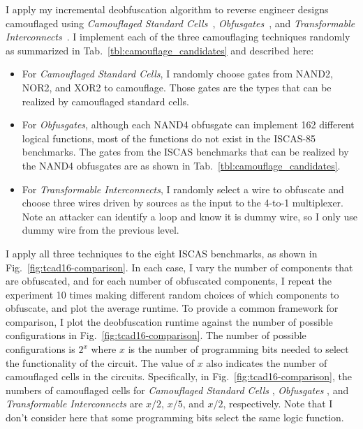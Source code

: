 \documentclass[thesis]{umassthesis}  %
\begin{document}
I apply my incremental deobfuscation algorithm to reverse engineer designs camouflaged using \textit{Camouflaged Standard Cells}~\cite{rajendran-13}, \textit{Obfusgates}~\cite{malik-obfusgate}, and \textit{Transformable Interconnects}~\cite{chen-2015-dummyWire}. I implement each of the three camouflaging techniques randomly as summarized in Tab.~\ref{tbl:camouflage_candidates} and described here: 
\begin{itemize}

\item For \textit{Camouflaged Standard Cells}, I randomly choose gates from NAND2, NOR2, and XOR2 to camouflage. Those gates are the types that can be realized by camouflaged standard cells.

\item For \textit{Obfusgates}, although each NAND4 obfusgate can implement 162 different logical functions, most of the functions do not exist in the ISCAS-85 benchmarks. The gates from the ISCAS benchmarks that can be realized by the NAND4 obfusgates are as shown in Tab.~\ref{tbl:camouflage_candidates}.

\item For \textit{Transformable Interconnects}, I randomly select a wire to obfuscate and choose three wires driven by sources as the input to the 4-to-1 multiplexer. Note an attacker can identify a loop and know it is dummy wire, so I only use dummy wire from the previous level.

\end{itemize}



I apply all three techniques to the eight ISCAS benchmarks, as shown in Fig.~\ref{fig:tcad16-comparison}. In each case, I vary the number of components that are obfuscated, and for each number of obfuscated components, I repeat the experiment 10 times making different random choices of which components to obfuscate, and plot the average runtime. To provide a common framework for comparison, I plot the deobfuscation runtime against the number of possible configurations in Fig.~\ref{fig:tcad16-comparison}. The number of possible configurations is $2^x$ where $x$ is the number of programming bits needed to select the functionality of the circuit. {The value of $x$ also indicates the number of camouflaged cells in the circuits. Specifically, in Fig.~\ref{fig:tcad16-comparison}, the numbers of camouflaged cells for \textit{Camouflaged Standard Cells} \cite{rajendran-13}, \textit{Obfusgates} \cite{malik-obfusgate}, and \textit{Transformable Interconnects} \cite{chen-2015-dummyWire} are $x/2$, $x/5$, and $x/2$, respectively}. Note that I don't consider here that some programming bits select the same logic function. 
\end{document}
